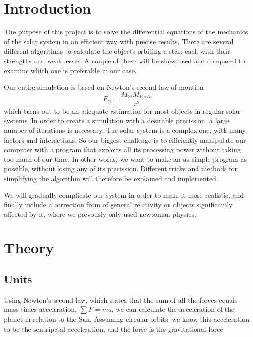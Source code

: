 \documentclass[10pt]{article}
\begin{document}
\newpage



\begin{multicols}{2}
\tableofcontents

{}

\section{Introduction}
The purpose of this project is to solve the differential equations of the
mechanics of the solar system in an efficient way with precise results.
There are several different algorithms to calculate the objects orbiting a
star, each with their strengths and weaknesses. A couple of these will be
showcased and compared to examine which one is preferable in our case.

Our entire simulation is based on Newton's second law of montion
\begin{equation}
    F_G = \frac{M_\Sun M_{Earth}}{r^2}
\end{equation}
which turns out to be an adequate estimation for most objects in
regular solar systems. In order to create a simulation with a desirable
precission, a large number of iterations is necessary. The solar system is
a complex one, with many factors and interactions. So our biggest challenge
is to efficiently manipulate our computer with a program that exploits all
its processing power without taking too much of our time. In other words,
we want to make an as simple program as possible, without losing any of its
precission. Different tricks and methods for simplifying the algorithm will
therefore be explained and implemented. 

We will gradually complicate our system in order to make it more realistic,
and finally include a correction from of general relativity on objects
significantly affected by it, where we prevously only used newtonian
physics.

\section{Theory}
\subsection{Units}
Using Newton's second law, which states that the sum of all the forces
equals mass times acceleration, $\sum F=ma$, we can calculate the
acceleration of the planet in relation to the Sun. Assuming circular
orbits, we know this acceleration to be the sentripetal acceleration, and
the force is the gravitational force


\end{multicols}
\end{document}
